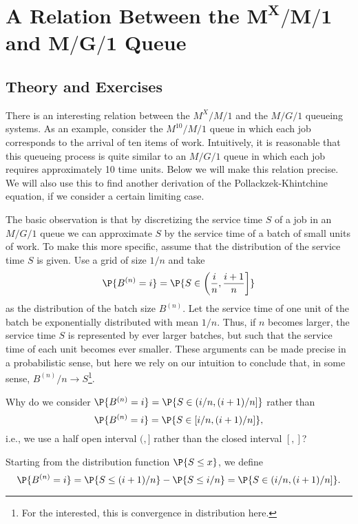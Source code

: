 \section
[A Relation Between the $M^X/M/1$ and $M/G/1$  Queue]
{A Relation Between the $\mathbf{M^X/M/1}$ and $\mathbf{M/G/1}$  Queue}
\label{sec:relat-batch-queu}


\subsection*{Theory and Exercises}



There is an interesting relation between the $M^X/M/1$ and the $M/G/1$
queueing systems. As an example, consider the $M^{10}/M/1$ queue in
which each job corresponds to the arrival of ten items of
work. Intuitively, it is reasonable that this queueing process is
quite similar to an $M/G/1$ queue in which each job requires
approximately 10 time units. Below we will make this relation
precise. We will also use this to find another derivation of the
Pollackzek-Khintchine equation, if we consider a certain limiting
case.


The basic observation is that by discretizing the service time $S$ of
a job in an $M/G/1$ queue we can approximate $S$ by the service time
of a batch of small units of work. To make this more specific, assume
that the distribution of the service time $S$ is given. Use a grid of
size $1/n$ and take
\begin{equation}\label{eq:69}
  \P{B^{(n)} = i} = \P{ S\in\left(\frac in, \frac{i+1}n\right]}
\end{equation}
as the distribution of the batch size $B^{(n)}$. Let the service time
of one unit of the batch be exponentially distributed with mean $1/n$.
Thus, if $n$ becomes larger, the service time $S$ is represented by
ever larger batches, but such that the service time of each unit
becomes ever smaller. These arguments can be made precise in a
probabilistic sense, but here we rely on our intuition to conclude
that, in some sense, $B^{(n)}/n \to S$\footnote{For the interested, this is convergence in distribution here.}.

\begin{exercise}
Why do we consider $\P{B^{(n)} = i} = \P{ S\in(i/n, (i+1)/n]}$ rather than
\begin{equation*}
\P{B^{(n)} = i} = \P{S\in[i/n, (i+1)/n]},  
\end{equation*}
i.e., we use a half open interval $(,]$ rather than the closed
interval $[,]$?
\begin{solution}
  Starting from the distribution function $\P{S\leq x}$, we define
  \begin{equation*}
  \P{B^{(n)} = i} = \P{ S\leq (i+1)/n} - \P{S\leq i/n} = \P{
  S\in(i/n, (i+1)/n]}.
     \end{equation*}
\end{solution}
\end{exercise}


